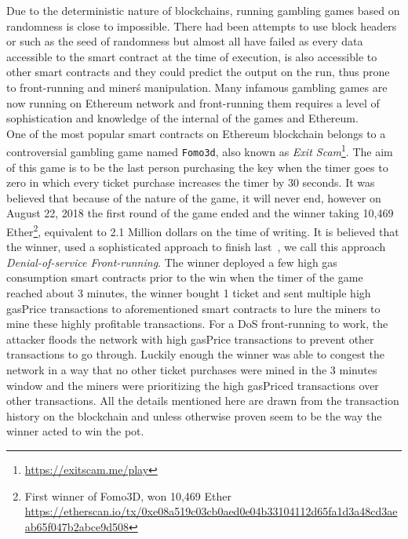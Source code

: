 Due to the deterministic nature of blockchains, running gambling games based on randomness is close to impossible. There had been attempts to use block headers or such as the seed of randomness but almost all have failed as every data accessible to the smart contract at the time of execution, is also accessible to other smart contracts and they could predict the output on the run, thus prone to front-running and miner\'s manipulation. Many infamous gambling games are now running on Ethereum network and front-running them requires a level of sophistication and knowledge of the internal of the games and Ethereum.\\
One of the most popular smart contracts on Ethereum blockchain belongs to a controversial gambling game named \texttt{Fomo3d}, also known as \textit{Exit Scam}\footnote{\url{https://exitscam.me/play}}. The aim of this game is to be the last person purchasing the key when the timer goes to zero in which every ticket purchase increases the timer by 30 seconds. It was believed that because of the nature of the game, it will never end, however on August 22, 2018 the first round of the game ended and the winner taking 10,469 Ether\footnote{First winner of Fomo3D, won 10,469 Ether \url{ https://etherscan.io/tx/0xe08a519c03cb0aed0e04b33104112d65fa1d3a48cd3aeab65f047b2abce9d508}}, equivalent to 2.1 Million dollars on the time of writing. 
It is believed that the winner, used a sophisticated approach to finish last~\cite{fomo3dhacker}, we call this approach \textit{Denial-of-service Front-running}. The winner deployed a few high gas consumption smart contracts prior to the win when the timer of the game reached about 3 minutes, the winner bought 1 ticket and sent multiple high gasPrice transactions to aforementioned smart contracts to lure the miners to mine these highly profitable transactions. For a DoS front-running to work, the attacker floods the network with high gasPrice transactions to prevent other transactions to go through. Luckily enough the winner was able to congest the network in a way that no other ticket purchases were mined in the 3 minutes window and the miners were prioritizing the high gasPriced transactions over other transactions. All the details mentioned here are drawn from the transaction history on the blockchain and unless otherwise proven seem to be the way the winner acted to win the pot. 



